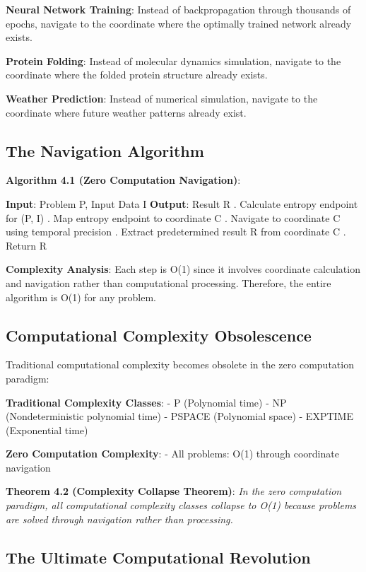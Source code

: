 \documentclass[12pt,a4paper]{article}
\theoremstyle{definition}
\begin{document}
{\textbf{Neural Network Training}: Instead of backpropagation through thousands of epochs, navigate to the coordinate where the optimally trained network already exists.

\textbf{Protein Folding}: Instead of molecular dynamics simulation, navigate to the coordinate where the folded protein structure already exists.

\textbf{Weather Prediction}: Instead of numerical simulation, navigate to the coordinate where future weather patterns already exist.

\subsection{The Navigation Algorithm}

\textbf{Algorithm 4.1 (Zero Computation Navigation)}:
\begin{algorithmic}
\STATE \textbf{Input}: Problem P, Input Data I
\STATE \textbf{Output}: Result R
\STATE
{}. Calculate entropy endpoint for (P, I)
. Map entropy endpoint to coordinate C
. Navigate to coordinate C using temporal precision
. Extract predetermined result R from coordinate C
. Return R
\end{algorithmic}

\textbf{Complexity Analysis}: Each step is O(1) since it involves coordinate calculation and navigation rather than computational processing. Therefore, the entire algorithm is O(1) for any problem.

\subsection{Computational Complexity Obsolescence}

Traditional computational complexity becomes obsolete in the zero computation paradigm:

\textbf{Traditional Complexity Classes}:
- P (Polynomial time)
- NP (Nondeterministic polynomial time)
- PSPACE (Polynomial space)
- EXPTIME (Exponential time)

\textbf{Zero Computation Complexity}:
- All problems: O(1) through coordinate navigation

\textbf{Theorem 4.2 (Complexity Collapse Theorem)}: \textit{In the zero computation paradigm, all computational complexity classes collapse to O(1) because problems are solved through navigation rather than processing.}

\subsection{The Ultimate Computational Revolution}

}
\end{document}
